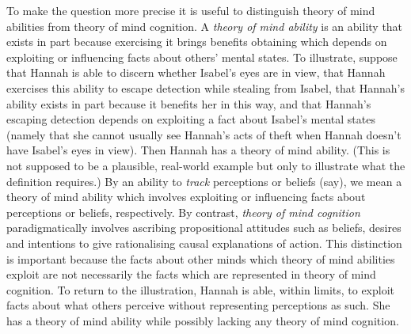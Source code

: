 \documentclass[12pt,\papersize]{extarticle}
\begin{document}
To make the question more precise it is useful to distinguish 
theory of mind abilities from theory of mind cognition.  
A  \textit{theory of mind ability} is an ability that exists in part because exercising it brings benefits obtaining which depends on exploiting or influencing facts about others’ mental states.
To illustrate,
suppose that Hannah is able to discern whether Isabel's eyes are in view,
that Hannah exercises this ability to escape detection while stealing from Isabel,
that Hannah's ability exists in part because it benefits her in this way,
and 
that Hannah's escaping detection depends on exploiting a fact about Isabel's mental states (namely that she cannot usually see Hannah's acts of theft when Hannah doesn't have Isabel's eyes in view).
Then Hannah has a theory of mind ability.
(This is not supposed to be a plausible, real-world example but only to illustrate what the definition requires.)
By an ability to \textit{track} perceptions or beliefs (say), we mean a theory of mind ability which involves exploiting or influencing facts about perceptions or beliefs, respectively.
By contrast, \textit{theory of mind cognition} paradigmatically involves ascribing propositional attitudes such as beliefs, desires and intentions to give rationalising causal explanations of action.  
This distinction is important because the facts about other minds which theory of mind abilities exploit are not necessarily the facts which are represented in theory of mind cognition.  
To return to the illustration, Hannah is able, within limits, to exploit facts about what others perceive without representing perceptions as such. 
She has a theory of mind ability while possibly lacking any theory of mind cognition.















































\small

\end{document}
